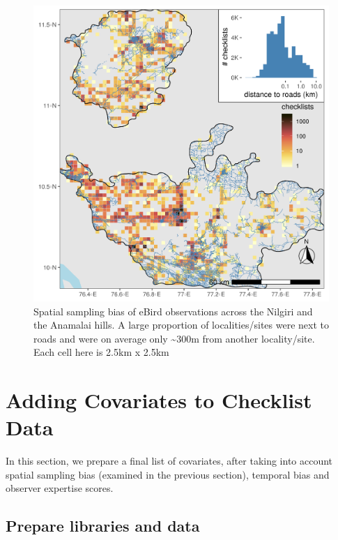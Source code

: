 \documentclass[]{article}
\begin{document}
\begin{figure}
\centering
\includegraphics{figs/fig_03_distance_to_roads.png}
\caption{Spatial sampling bias of eBird observations across the Nilgiri and the Anamalai hills. A large proportion of localities/sites were next to roads and were on average only \textasciitilde{}300m from another locality/site. Each cell here is 2.5km x 2.5km}
\end{figure}

\hypertarget{adding-covariates-to-checklist-data}{%
\section{Adding Covariates to Checklist Data}\label{adding-covariates-to-checklist-data}}

In this section, we prepare a final list of covariates, after taking into account spatial sampling bias (examined in the previous section), temporal bias and observer expertise scores.

\hypertarget{prepare-libraries-and-data}{%
\subsection{Prepare libraries and data}\label{prepare-libraries-and-data}}
\end{document}
